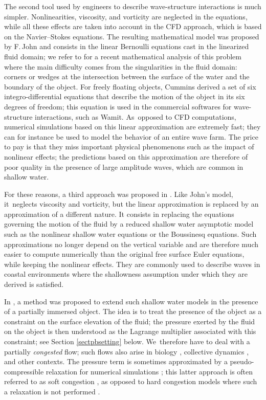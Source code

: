 \documentclass[11pt]{article}
\theoremstyle{definition}
\begin{document}
The second tool used by engineers to describe wave-structure interactions is much simpler.
Nonlinearities, viscosity, and vorticity are neglected in the equations,
while all these effects are taken into account in the CFD approach, which is based on the Navier--Stokes equations.
The resulting mathematical model was proposed by F.\,John \cite{John1,John2} and consists in the linear Bernoulli equations cast in the linearized fluid domain;
we refer to \cite{LannesMing} for a recent mathematical analysis of this problem where the main difficulty comes from the singularities in the fluid domain:
corners or wedges at the intersection between the surface of the water and the boundary of the object.
For freely floating objects, Cummins \cite{Cummins} derived a set of six integro-differential equations
that describe the motion of the object in its six degrees of freedom;
this equation is used in the commercial softwares for wave-structure interactions, such as Wamit. As~opposed to CFD computations, numerical simulations based on this linear approximation are extremely fast;
they can for instance be used to model the behavior of an entire wave farm.
The price to pay is that they miss important physical phenomenons such as the impact of nonlinear effects;
the predictions based on this approximation are therefore of poor quality in the presence of large amplitude waves, which are common in shallow water.

For these reasons, a third approach was proposed in \cite{Lannes2017}.
Like John's model, it~\hbox{neglects} viscosity and vorticity, but the linear approximation is replaced by an approximation of a different nature.
It consists in replacing the equations governing the motion of the fluid by a reduced shallow water asymptotic model
such as the nonlinear shallow water equations or the Boussinesq equations.
Such approximations no longer depend on the vertical variable and are therefore much easier to compute numerically than the original free surface Euler equations,
while keeping the nonlinear effects.
They are commonly used to describe waves in coastal environments where the shallowness assumption under which they are derived is satisfied.

In \cite{Lannes2017}, a method was proposed to extend such shallow water models in the presence of a partially immersed object.
The idea is to treat the presence of the object as a constraint on the surface elevation of the fluid;
the pressure exerted by the fluid on the object is then understood as the Lagrange multiplier associated with this constraint;
see Section \ref{sectpbsetting} below. We~therefore have to deal with a partially {\it congested} flow;
such flows also arise in biology \cite{PQV}, collective dynamics \cite{DHN,MRSV}, and other contexts.
The pressure term is sometimes approximated by a pseudo-compressible relaxation for numerical simulations \cite{GPSW1,GPSW2};
this latter approach is often referred to as soft congestion \cite{Perrin},
as opposed to hard congestion models where such a relaxation is not performed \cite{ABP,DalibardPerrin1,DalibardPerrin2}.
\end{document}

